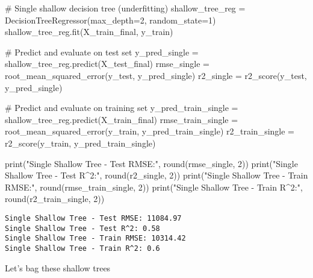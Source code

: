 \documentclass[
  letterpaper,
  DIV=11,
  numbers=noendperiod]{scrreprt}
\newenvironment{Shaded}{\begin{snugshade}}{\end{snugshade}}
\newcommand{\BuiltInTok}[1]{\textcolor[rgb]{0.00,0.23,0.31}{#1}}
\newcommand{\CommentTok}[1]{\textcolor[rgb]{0.37,0.37,0.37}{#1}}
\newcommand{\DecValTok}[1]{\textcolor[rgb]{0.68,0.00,0.00}{#1}}
\newcommand{\NormalTok}[1]{\textcolor[rgb]{0.00,0.23,0.31}{#1}}
\newcommand{\OperatorTok}[1]{\textcolor[rgb]{0.37,0.37,0.37}{#1}}
\newcommand{\StringTok}[1]{\textcolor[rgb]{0.13,0.47,0.30}{#1}}
\begin{document}
\begin{Shaded}
\begin{Highlighting}[]
\CommentTok{\# Single shallow decision tree (underfitting)}
\NormalTok{shallow\_tree\_reg }\OperatorTok{=}\NormalTok{ DecisionTreeRegressor(max\_depth}\OperatorTok{=}\DecValTok{2}\NormalTok{, random\_state}\OperatorTok{=}\DecValTok{1}\NormalTok{)}
\NormalTok{shallow\_tree\_reg.fit(X\_train\_final, y\_train)}

\CommentTok{\# Predict and evaluate on test set}
\NormalTok{y\_pred\_single }\OperatorTok{=}\NormalTok{ shallow\_tree\_reg.predict(X\_test\_final)}
\NormalTok{rmse\_single }\OperatorTok{=}\NormalTok{ root\_mean\_squared\_error(y\_test, y\_pred\_single)}
\NormalTok{r2\_single }\OperatorTok{=}\NormalTok{ r2\_score(y\_test, y\_pred\_single)}

\CommentTok{\# Predict and evaluate on training set}
\NormalTok{y\_pred\_train\_single }\OperatorTok{=}\NormalTok{ shallow\_tree\_reg.predict(X\_train\_final)}
\NormalTok{rmse\_train\_single }\OperatorTok{=}\NormalTok{ root\_mean\_squared\_error(y\_train, y\_pred\_train\_single)}
\NormalTok{r2\_train\_single }\OperatorTok{=}\NormalTok{ r2\_score(y\_train, y\_pred\_train\_single)}

\BuiltInTok{print}\NormalTok{(}\StringTok{"Single Shallow Tree {-} Test RMSE:"}\NormalTok{, }\BuiltInTok{round}\NormalTok{(rmse\_single, }\DecValTok{2}\NormalTok{))}
\BuiltInTok{print}\NormalTok{(}\StringTok{"Single Shallow Tree {-} Test R\^{}2:"}\NormalTok{, }\BuiltInTok{round}\NormalTok{(r2\_single, }\DecValTok{2}\NormalTok{))}
\BuiltInTok{print}\NormalTok{(}\StringTok{"Single Shallow Tree {-} Train RMSE:"}\NormalTok{, }\BuiltInTok{round}\NormalTok{(rmse\_train\_single, }\DecValTok{2}\NormalTok{))}
\BuiltInTok{print}\NormalTok{(}\StringTok{"Single Shallow Tree {-} Train R\^{}2:"}\NormalTok{, }\BuiltInTok{round}\NormalTok{(r2\_train\_single, }\DecValTok{2}\NormalTok{))}
\end{Highlighting}
\end{Shaded}

\begin{verbatim}
Single Shallow Tree - Test RMSE: 11084.97
Single Shallow Tree - Test R^2: 0.58
Single Shallow Tree - Train RMSE: 10314.42
Single Shallow Tree - Train R^2: 0.6
\end{verbatim}

Let's bag these shallow trees
\end{document}
